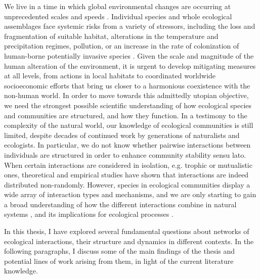 We live in a time in which global environmental changes are occurring at unprecedented scales and speeds \citep{Pachauri2015}. Individual species and whole ecological assemblages face systemic risks from a variety of stressors, including the loss and fragmentation of suitable habitat, alterations in the temperature and precipitation regimes, pollution, or an increase in the rate of colonization of human-borne potentially invasive species \citep{Vitousek1994}. Given the scale and magnitude of the human alteration of the environment, it is urgent to develop mitigating measures at all levels, from actions in local habitats to coordinated worldwide socioeconomic efforts that bring us closer to a harmonious coexistence with the non-human world. In order to move towards this admittedly utopian objective, we need the strongest possible scientific understanding of how ecological species and communities are structured, and how they function. In a testimony to the complexity of the natural world, our knowledge of ecological communities is still limited, despite decades of continued work by generations of naturalists and ecologists. In particular, we do not know whether pairwise interactions between individuals are structured in order to enhance community stability sensu lato. When certain interactions are considered in isolation, e.g. trophic or mutualistic ones, theoretical \citep{Williams2000} and empirical \citep{Thebault2010} studies have shown that interactions are indeed distributed non-randomly. However, species in ecological communities display a wide array of interaction types and mechanisms, and we are only starting to gain a broad understanding of how the different interactions combine in natural systems \citep{Kefi2015}, and its implications for ecological processes \citep{Pocock2012}.

In this thesis, I have explored several fundamental questions about networks of ecological interactions, their structure and dynamics in different contexts. In the following paragraphs, I discuss some of the main findings of the thesis and potential lines of work arising from them, in light of the current literature knowledge.

